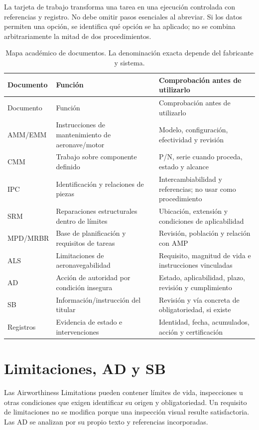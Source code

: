 La tarjeta de trabajo transforma una tarea en una ejecución controlada con referencias y registro. No debe omitir pasos esenciales al abreviar. Si los datos permiten una opción, se identifica qué opción se ha aplicado; no se combina arbitrariamente la mitad de dos procedimientos.
\begin{longtable}{p{.14\linewidth}p{.32\linewidth}p{.42\linewidth}}
\caption{Mapa académico de documentos. La denominación exacta depende del fabricante y sistema.}\label{tab:documentos}\\\toprule
Documento & Función & Comprobación antes de utilizarlo\\\midrule\endfirsthead
\toprule Documento & Función & Comprobación antes de utilizarlo\\\midrule\endhead
AMM/EMM & Instrucciones de mantenimiento de aeronave/motor & Modelo, configuración, efectividad y revisión\\[4pt]
CMM & Trabajo sobre componente definido & P/N, serie cuando proceda, estado y alcance\\[4pt]
IPC & Identificación y relaciones de piezas & Intercambiabilidad y referencias; no usar como procedimiento\\[4pt]
SRM & Reparaciones estructurales dentro de límites & Ubicación, extensión y condiciones de aplicabilidad\\[4pt]
MPD/MRBR & Base de planificación y requisitos de tareas & Revisión, población y relación con AMP\\[4pt]
ALS & Limitaciones de aeronavegabilidad & Requisito, magnitud de vida e instrucciones vinculadas\\[4pt]
AD & Acción de autoridad por condición insegura & Estado, aplicabilidad, plazo, revisión y cumplimiento\\[4pt]
SB & Información/instrucción del titular & Revisión y vía concreta de obligatoriedad, si existe\\[4pt]
Registros & Evidencia de estado e intervenciones & Identidad, fecha, acumulados, acción y certificación\\\bottomrule
\end{longtable}
\section{Limitaciones, AD y SB}
Las Airworthiness Limitations pueden contener límites de vida, inspecciones u otras condiciones que exigen identificar su origen y obligatoriedad. Un requisito de limitaciones no se modifica porque una inspección visual resulte satisfactoria. Las AD se analizan por su propio texto y referencias incorporadas.

